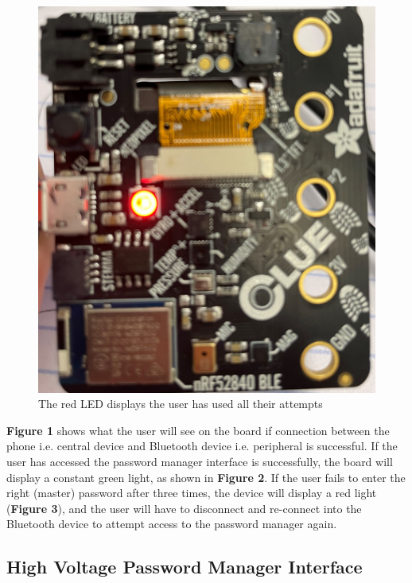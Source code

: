 \documentclass[12pt]{article}
\begin{document}
\begin{figure}[H]
\centering
\includegraphics[width=4.5in]{red.jpg}
\caption{The red LED displays the user has used all their attempts}
\label{fig:red}
\end{figure}

\hspace{1cm}\textbf{Figure 1} shows what the user will see on the board if connection between the phone i.e. central device and Bluetooth device i.e. peripheral is successful. If the user has accessed the password manager interface is successfully, the board will display a constant green light, as shown in \textbf{Figure 2}. If the user fails to enter the right (master) password after three times, the device will display a red light (\textbf{Figure 3}), and the user will have to disconnect and re-connect into the Bluetooth device to attempt access to the password manager again. 

\subsection{High Voltage Password Manager Interface}
\end{document}
